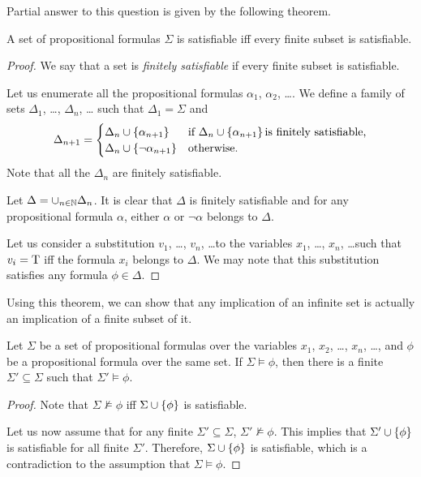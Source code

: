 Partial answer to this question is given by the following theorem.
\begin{theorem}
  A set of propositional formulas $\Sigma$ is satisfiable iff every finite
  subset is satisfiable.
\end{theorem}
\begin{proof}
  We say that a set is \emph{finitely satisfiable} if every finite subset
  is satisfiable.


  Let us enumerate all the propositional formulas $\alpha_1$, $\alpha_2$, \dots.
  We define a family of sets $\Delta_1$, \dots, $\Delta_n$, \dots
  such that $\Delta_1 = \Sigma$ and
  \[
    \Delta_{n + 1} =
    \begin{cases}
      \Delta_n \cup \set{\alpha_{n + 1}} & \text{if }
        \Delta_n \cup \set{\alpha_{n + 1}} \text{is finitely satisfiable,} \\
      \Delta_n \cup \set{\lnot \alpha_{n + 1}} & \text{otherwise.}
    \end{cases}
  \]
  Note that all the $\Delta_n$ are finitely satisfiable.

  Let $\Delta = \cup_{n \in \mathbb{N}} \Delta_n$. It is clear that $\Delta$ is
  finitely satisfiable and for any propositional formula $\alpha$,
  either $\alpha$ or $\lnot \alpha$ belongs to $\Delta$.

  Let us consider a substitution $v_1$, \dots, $v_n$, \dots to the variables
  $x_1$, \dots, $x_n$, \dots such that $v_i = \text{T}$ iff the formula $x_i$
  belongs to $\Delta$. We may note that this substitution satisfies any
  formula $\phi \in \Delta$.
\end{proof}

Using this theorem, we can show that any implication of an infinite set is
actually an implication of a finite subset of it.
\begin{corollary}
  Let $\Sigma$ be a set of propositional formulas over the variables
  $x_1$, $x_2$, \dots, $x_n$, \dots, and $\phi$ be a propositional formula
  over the same set. If $\Sigma \models \phi$, then there is a finite
  $\Sigma' \subseteq \Sigma$ such that $\Sigma' \models \phi$.
\end{corollary}
\begin{proof}
  Note that $\Sigma \not\models \phi$ iff $\Sigma \cup \set{\phi}$ is
  satisfiable.

  Let us now assume that for any finite $\Sigma' \subseteq \Sigma$,
  $\Sigma' \not\models \phi$. This implies that $\Sigma' \cup \set{\phi}$
  is satisfiable for all finite $\Sigma'$. Therefore, $\Sigma \cup \set{\phi}$
  is satisfiable, which is a contradiction to the assumption that
  $\Sigma \models \phi$.
\end{proof}


